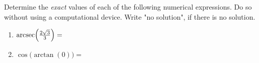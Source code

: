 \documentclass{ximera}
\author{Elizabeth Campolongo}
\begin{document}
\begin{exercise}

Determine the {\it exact} values of each of the following numerical expressions. Do so without using a computational device. Write "no solution", if there is no solution.
%


\begin{enumerate}
\item $\operatorname{arcsec}\!\Big(\frac{2\sqrt{3}}{3}\Big)= $
\begin{multipleChoice}
	\choice{$\pi$}
\end{multipleChoice}

%
%
%
%
%
\item $\cos\big(\arctan(0)\big) = $
\begin{multipleChoice}
\end{multipleChoice}


\end{enumerate}
\end{exercise}
\end{document}
